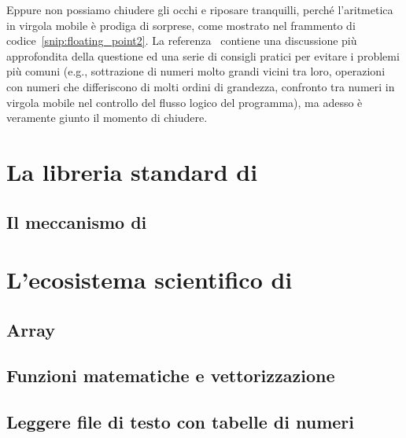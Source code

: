 
Eppure non possiamo chiudere gli occhi e riposare tranquilli, perché l'aritmetica in
virgola mobile è prodiga di sorprese, come mostrato nel frammento di
codice~\ref{snip:floating_point2}. La referenza~\cite{bush_floating_point}
contiene una discussione più approfondita della questione ed una serie di consigli
pratici per evitare i problemi più comuni (e.g., sottrazione di numeri molto grandi
vicini tra loro, operazioni con numeri che differiscono di molti ordini di grandezza,
confronto tra numeri in virgola mobile nel controllo del flusso logico del programma),
ma adesso è veramente giunto il momento di chiudere.


\section{La libreria standard di \python}

\subsection{Il meccanismo di }

\section{L'ecosistema scientifico di \python}

\subsection{\numpy}
\label{sec:numpy}

\subsection{Array}

\subsection{Funzioni matematiche e vettorizzazione}

\subsection{Leggere file di testo con tabelle di numeri}
\label{sec:numpy_loadtxt}


